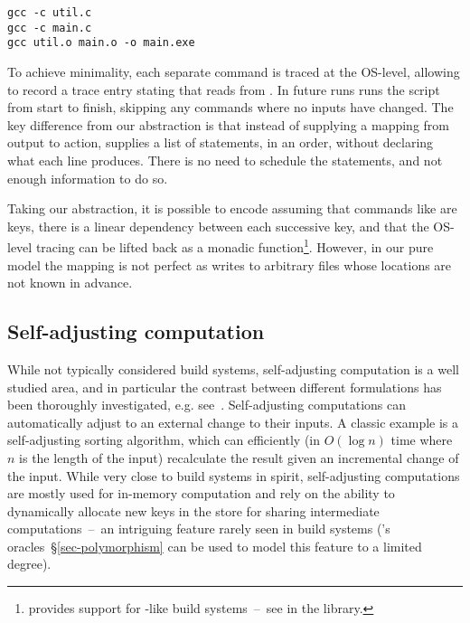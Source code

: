 \begin{verbatim}
gcc -c util.c
gcc -c main.c
gcc util.o main.o -o main.exe
\end{verbatim}

\noindent
To achieve minimality, each separate command is traced at the OS-level, allowing
\Fabricate to record a trace entry stating that  reads from
. In future runs \Fabricate runs the script from start to finish,
skipping any commands where no inputs have changed. The key difference from our
 abstraction is that instead of supplying a mapping from output to action,
\Fabricate supplies a list of statements, in an order, without declaring what each line produces.
There is no need to schedule the statements, and not enough information to do so.

Taking our abstraction, it is possible to encode \Fabricate assuming that
commands like  are keys, there is a linear dependency between
each successive key, and that the OS-level tracing can be lifted back as a
monadic  function\footnote{\Shake provides support for
\Fabricate{}-like build systems~--~see 
in the \Shake library.}. However, in our pure model the mapping is not perfect
as  writes to arbitrary files whose locations are not known in advance.

\subsection{Self-adjusting computation}

While not typically considered build systems, self-adjusting computation is a
well studied area, and in particular the contrast between different formulations
has been thoroughly investigated, e.g. see~\cite{acar2007selfadjusting}.
Self-adjusting computations can automatically adjust to an external change
to their inputs. A classic example is a self-adjusting sorting algorithm, which
can efficiently (in $O(\log{n})$ time where $n$ is the length of the input)
recalculate the result given an incremental change of the input. While very
close to build systems in spirit, self-adjusting computations are mostly used
for in-memory computation and rely on the ability to dynamically allocate new
keys in the store for sharing intermediate computations~--~an intriguing feature
rarely seen in build systems (\Shake's oracles~\S\ref{sec-polymorphism} can be
used to model this feature to a limited degree).

